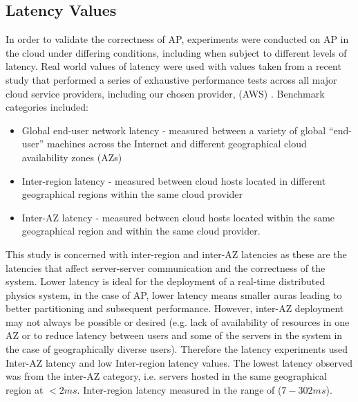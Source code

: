 

\subsection{Latency Values}
In order to validate the correctness of AP, experiments were conducted on AP in the cloud under differing conditions, including when subject to different levels of latency. Real world values of latency were used with values taken from a recent study that performed a series of exhaustive performance tests across all major cloud service providers, including our chosen provider, (AWS) \cite{ThousandEyesCloudPerf2019}. Benchmark categories included:
\begin{itemize}
	\item Global end-user network latency - measured between a variety of global ``end-user'' machines across the Internet and different geographical cloud availability zones (AZs)
	\item Inter-region latency - measured between cloud hosts located in different geographical regions within the same cloud provider
	\item Inter-AZ latency - measured between cloud hosts located within the same geographical region and within the same cloud provider.
\end{itemize}

This study is concerned with inter-region and inter-AZ latencies as these are the latencies that affect server-server communication and the correctness of the system. Lower latency is ideal for the deployment of a real-time distributed physics system, in the case of AP, lower latency means smaller auras leading to better partitioning and subsequent performance. However, inter-AZ deployment may not always be possible or desired (e.g. lack of availability of resources in one AZ or to reduce latency between users and some of the servers in the system in the case of geographically diverse users). Therefore the latency experiments used Inter-AZ latency and low Inter-region latency values.  The lowest latency observed was from the inter-AZ category, i.e. servers hosted in the same geographical region at $<2ms$. Inter-region latency measured in the range of ($7-302ms$). 

